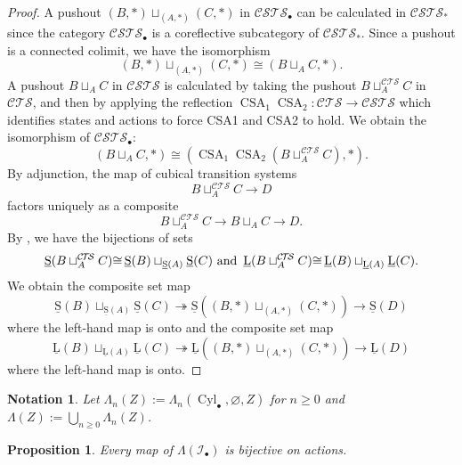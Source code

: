 \documentclass[a4paper,12pt]{amsart}
\newtheorem{prop}[thm]{Proposition}
\newtheorem{nota}[thm]{Notation}
\begin{document}
\begin{proof} A pushout $(B,*)\sqcup_{(A,*)} (C,*)$ in ${\mathcal{C\!S\!T\!S}}_\bullet$ can be
calculated in ${\mathcal{C\!S\!T\!S}}_*$ since the category ${\mathcal{C\!S\!T\!S}}_\bullet$ is a
coreflective subcategory of ${\mathcal{C\!S\!T\!S}}_*$. Since a pushout is a connected
 colimit, we have the isomorphism 
 \[(B,*)\sqcup_{(A,*)} (C,*) {\cong} (B \sqcup_A C,*).\] A pushout $B
 \sqcup_A C$ in ${\mathcal{C\!S\!T\!S}}$ is calculated by taking the pushout $B
 \sqcup^{\mathcal{C\!T\!S}}_A C$ in ${\mathcal{C\!T\!S}}$, and then by applying the reflection
 $\operatorname{CSA}_1\operatorname{CSA}_2:{\mathcal{C\!T\!S}}\to {\mathcal{C\!S\!T\!S}}$ which identifies states and actions to
 force CSA1 and CSA2 to hold.  We obtain the isomorphism of
 ${\mathcal{C\!S\!T\!S}}_\bullet$:
 \[(B \sqcup_A C,*) {\cong} (\operatorname{CSA}_1\operatorname{CSA}_2(B \sqcup^{\mathcal{C\!T\!S}}_A C),*).\] By
 adjunction, the map of cubical transition systems \[B \sqcup^{\mathcal{C\!T\!S}}_A C
 \to D\] factors uniquely as a composite \[B \sqcup^{\mathcal{C\!T\!S}}_A C
 \longrightarrow B \sqcup_A C\longrightarrow D.\] By
 \cite[Lemma~3.5]{biscsts1}, we have the bijections of sets \[\operatorname{\underline{S}}(B
 \sqcup^{\mathcal{C\!T\!S}}_A C) {\cong} \operatorname{\underline{S}}(B) \sqcup_{\operatorname{\underline{S}}(A)} \operatorname{\underline{S}}(C) \hbox{ and }\operatorname{\underline{L}}(B
 \sqcup^{\mathcal{C\!T\!S}}_A C) {\cong} \operatorname{\underline{L}}(B) \sqcup_{\operatorname{\underline{L}}(A)} \operatorname{\underline{L}}(C).\] We obtain the
 composite set map \[\operatorname{\underline{S}}(B) \sqcup_{\operatorname{\underline{S}}(A)} \operatorname{\underline{S}}(C) \twoheadrightarrow
 \operatorname{\underline{S}}((B,*) \sqcup_{(A,*)} (C,*)) \longrightarrow \operatorname{\underline{S}}(D)\] where the
 left-hand map is onto and the composite set map \[\operatorname{\underline{L}}(B)
 \sqcup_{\operatorname{\underline{L}}(A)} \operatorname{\underline{L}}(C) \twoheadrightarrow \operatorname{\underline{L}}((B,*) \sqcup_{(A,*)}
 (C,*)) \longrightarrow \operatorname{\underline{L}}(D)\] where the left-hand map is onto.
 \end{proof}

\begin{nota} Let $\Lambda_n(Z) :=
  \Lambda_n(\operatorname{{Cyl}}_\bullet,\varnothing,Z)$ for $n{\geqslant} 0$ and $\Lambda(Z)
  := \bigcup_{n{\geqslant} 0} \Lambda_n(Z)$.
\end{nota}

\begin{prop} \label{ex0} Every map of $\Lambda({\mathcal{I}}_\bullet)$ is bijective on
actions.  \end{prop}
\end{document}
